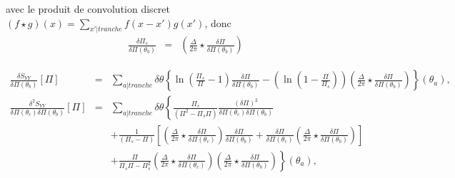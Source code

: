 	avec le produit de convolution discret $( f \star g )(x) = \sum_{x'\vert tranche } f( x - x') g(x') $, donc 
	\begin{eqnarray}
			\frac{\delta \Pi_s }{\delta \Pi( \theta_b)}   & = &\left  ( \frac{\Delta}{2\pi} \star \frac{\delta \Pi}{\delta \Pi(\theta_b) }  \right )	
		\end{eqnarray}
	
	\begin{eqnarray}
			\frac{ \delta S_{YY} }{ \delta \Pi(\theta_b)} [\Pi ]  & = & \sum_{a\vert tranche}   \delta \theta \left \{ \ln \left ( \frac{ \Pi_s }{ \Pi} - 1 \right )\frac{\delta \Pi }{ \delta \Pi (\theta_b) } -  \left ( \ln \left ( 1 - \frac{ \Pi}{ \Pi_s}\right ) \right ) \left ( \frac{ \Delta}{2 \pi} \star \frac{\delta \Pi }{ \delta \Pi(\theta_b) }  \right)\right \} ( \theta_	a ),\\
			\frac{ \delta^2 S_{YY} }{ \delta \Pi(\theta_c) \delta \Pi(\theta_b)  } [\Pi ]  & = & \sum_{a \vert tranche}   \delta \theta \left \{  \frac{\Pi_s}{(\Pi^2  - \Pi_s\Pi)} \frac{(\delta \Pi)^2}{ \delta \Pi(\theta_c) \delta \Pi(\theta_b)  } \right . \\
		&  &  +  \left . \frac{1 }{(\Pi_s -\Pi) } \left [ \left (  \frac{\Delta}{2\pi} \star\frac{\delta \Pi}{\delta \Pi(\theta_c)}   \right ) \frac{\delta \Pi}{\delta \Pi(\theta_b)}+ \frac{\delta \Pi}{\delta \Pi(\theta_c)} \left (  \frac{\Delta}{2\pi} \star\frac{\delta \Pi}{\delta \Pi(\theta_b)} \right )  \right ] \right . \\
		& & + \left .  \frac{\Pi }{\Pi_s\Pi - \Pi_s^2 }\left (  \frac{\Delta}{2\pi} \star\frac{\delta \Pi}{\delta \Pi(\theta_c)} \right )\left (  \frac{\Delta}{2\pi} \star\frac{\delta \Pi}{\delta \Pi(\theta_b)} \right )  \right \}(\theta_a),	
	\end{eqnarray}
	
%	
		
